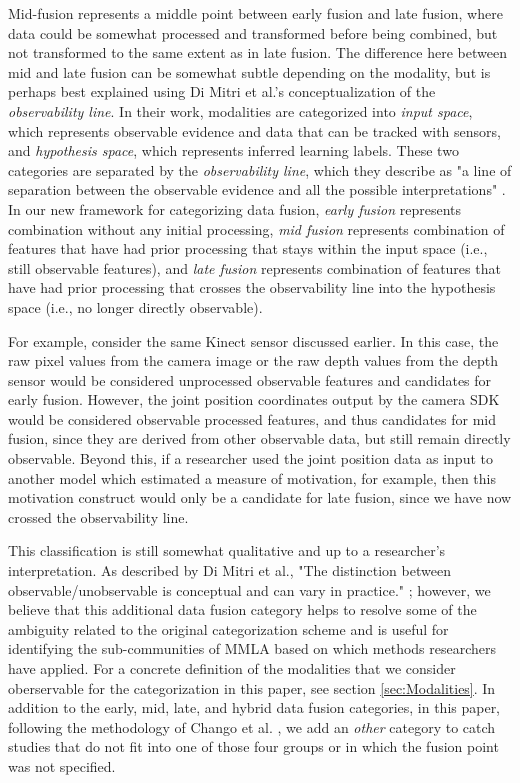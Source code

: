 \documentclass[manuscript,screen,review]{acmart}
\begin{document}
Mid-fusion represents a middle point between early fusion and late fusion, where data could be somewhat processed and transformed before being combined, but not transformed to the same extent as in late fusion. The difference here between mid and late fusion can be somewhat subtle depending on the modality, but is perhaps best explained using Di Mitri et al.’s \cite{DiMitri2018} conceptualization of the \textit{observability line}. In their work, modalities are categorized into \textit{input space}, which represents observable evidence and data that can be tracked with sensors, and \textit{hypothesis space}, which represents inferred learning labels. These two categories are separated by the \textit{observability line}, which they describe as "a line of separation between the observable evidence and all the possible interpretations" \cite{DiMitri2018}. In our new framework for categorizing data fusion, \textit{early fusion} represents combination without any initial processing, \textit{mid fusion} represents combination of features that have had prior processing that stays within the input space (i.e., still observable features), and \textit{late fusion} represents combination of features that have had prior processing that crosses the observability line into the hypothesis space (i.e., no longer directly observable).

For example, consider the same Kinect sensor discussed earlier. In this case, the raw pixel values from the camera image or the raw depth values from the depth sensor would be considered unprocessed observable features and candidates for early fusion. However, the joint position coordinates output by the camera SDK would be considered observable processed features, and thus candidates for mid fusion, since they are derived from other observable data, but still remain directly observable. Beyond this, if a researcher used the joint position data as input to another model which estimated a measure of motivation, for example, then this motivation construct would only be a candidate for late fusion, since we have now crossed the observability line. 

This classification is still somewhat qualitative and up to a researcher's interpretation. As described by Di Mitri et al., "The distinction between observable/unobservable is conceptual and can vary in practice." \cite{DiMitri2018}; however, we believe that this additional data fusion category helps to resolve some of the ambiguity related to the original categorization scheme and is useful for identifying the sub-communities of MMLA based on which methods researchers have applied. For a concrete definition of the modalities that we consider oberservable for the categorization in this paper, see section \ref{sec:Modalities}. In addition to the early, mid, late, and hybrid data fusion categories, in this paper, following the methodology of Chango et al. \cite{Chango2022}, we add an \textit{other} category to catch studies that do not fit into one of those four groups or in which the fusion point was not specified.
\end{document}
